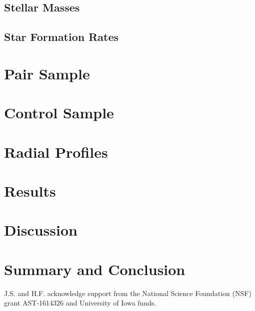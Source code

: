 \documentclass[iop,revtex4,twocolumn,apj,numberedappendix,appendixfloats]{emulateapj}
\begin{document}
\subsection{Stellar Masses}

\subsection{Star Formation Rates}

\section{Pair Sample}\label{sec:pair}


\section{Control Sample}\label{sec:control}


\section{Radial Profiles}\label{sec:radial}


\section{Results}\label{sec:results}


\section{Discussion}\label{sec:discussion}


\section{Summary and Conclusion}\label{sec:sum}






\acknowledgments

J.S. and H.F. acknowledge support from the National Science Foundation (NSF) grant AST-1614326 and University of Iowa funds. 



\end{document}
